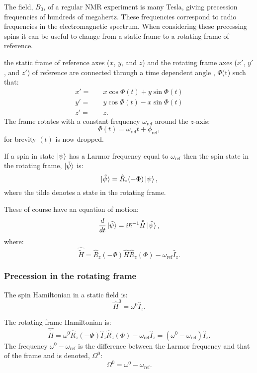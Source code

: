 The field, $B_0$, of a regular NMR experiment is many Tesla, giving precession
frequencies of hundreds of megahertz. These frequencies correspond to radio frequencies
in the electromagnetic spectrum. When considering these precessing spins
it can be useful to change from a static frame to a rotating frame of reference.

the static frame of reference axes ($x$, $y$, and $z$) and the rotating frame axes ($x'$, $y'$, and $z'$) of reference are connected through
a time dependent angle , $\Phi$(t) such that:
\begin{align}
  x' =&\quad x\cos\Phi(t) + y\sin\Phi(t)\\
  y' =&\quad y\cos\Phi(t) - x\sin\Phi(t)\\
  z' =&\quad z.
\end{align}
The frame rotates with a constant frequency $\omega_\text{ref}$ around the $z$-axis:
\begin{equation}
  \Phi(t) = \omega_{\text{ref}}t + \phi_{\text{ref}},
\end{equation}
for brevity $(t)$ is now dropped.

If a spin in state $\ket{\psi}$ has a Larmor frequency equal to $\omega_\text{ref}$
then the spin state in the rotating frame, $\ket{\tilde{\psi}}$ is:
\begin{equation}
  \ket{\tilde{\psi}} = \hat{R}_z(-\Phi)\ket{\psi},
\end{equation}
where the tilde denotes a state in the rotating frame.

These of course have an equation of motion:
\begin{equation}
  \frac{d}{dt}\ket{\tilde{\psi}} = i\hbar^{-1}\hat{\tilde{H}}\ket{\tilde{\psi}},
\end{equation}
where:
\begin{equation}\label{eqn:RotFrame}
  \hat{\tilde{H}} = \hat{R}_z(-\Phi)\hat{H}\hat{R}_z(\Phi) - \omega_\text{ref}\hat{I}_z.
\end{equation}

\subsubsection{Precession in the rotating frame}
The spin Hamiltonian in a static field is:
\begin{equation}
  \hat{H}^0 = \omega^0\hat{I}_z.
\end{equation}

The rotating frame Hamiltonian is:
\begin{equation}
  \hat{\tilde{H}} = \omega^0\hat{R}_z(-\Phi)\hat{I}_z\hat{R}_z(\Phi) - \omega_\text{ref}\hat{I}_z =
  (\omega^0 - \omega_\text{ref})\hat{I}_z.
\end{equation}
The frequency $\omega^0 - \omega_\text{ref}$ is the difference between the Larmor frequency
and that of the frame and is denoted, $\Omega^0$:
\begin{equation}
  \Omega^0 = \omega^0 - \omega_\text{ref}.
\end{equation}

